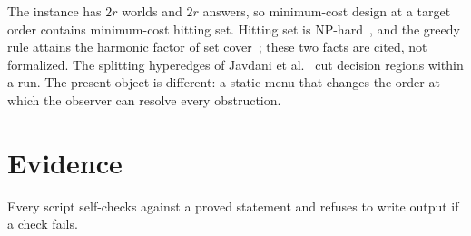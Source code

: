 The instance has $2r$ worlds and $2r$ answers, so minimum-cost design at a target order contains
minimum-cost hitting set. Hitting set is NP-hard~\cite{karp1972}, and the greedy rule attains
the harmonic factor of set cover~\cite{johnson1974,chvatal1979}; these two facts are cited, not
formalized. The splitting hyperedges of Javdani et al.~\cite{javdani2014} cut decision regions
within a run. The present object is different: a static menu that changes the order at which
the observer can resolve every obstruction.

\section{Evidence}
\label{sec:evidence}

Every script self-checks against a proved statement and refuses to write output if a check
fails.

\begin{table}[t]
\caption{Evidence packages. Each script self-checks against a Lean statement.}
\label{tab:evidence}
\centering
\footnotesize
{}
\end{table}

